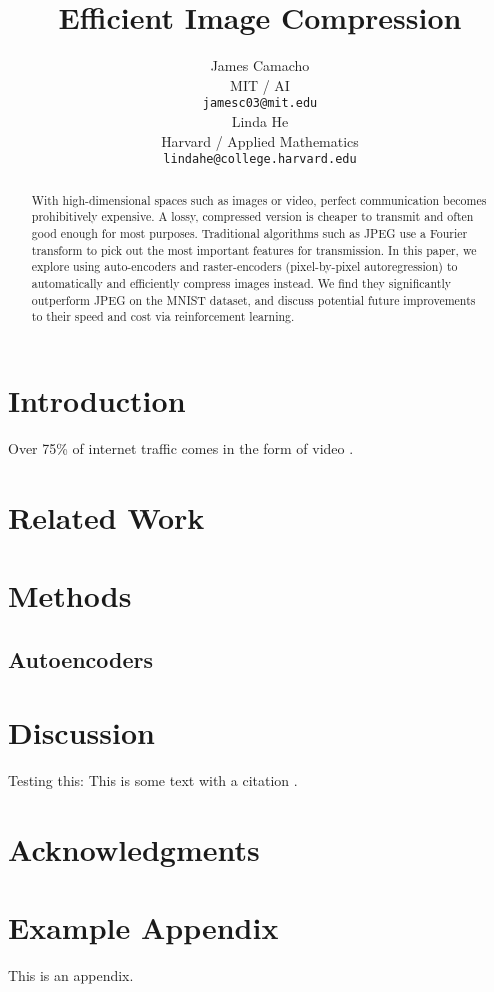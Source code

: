 \documentclass[11pt]{article}
\title{Efficient Image Compression}
\author{James Camacho \\
  MIT / AI \\
  \texttt{jamesc03@mit.edu} \\\And
  Linda He \\
  Harvard / Applied Mathematics \\
  \texttt{lindahe@college.harvard.edu} \\}
\begin{document}
\maketitle
\begin{abstract}
  With high-dimensional spaces such as images or video, perfect communication becomes prohibitively expensive. A lossy, compressed version is cheaper to transmit and often good enough for most purposes. Traditional algorithms such as JPEG use a Fourier transform to pick out the most important features for transmission. In this paper, we explore using auto-encoders and raster-encoders (pixel-by-pixel autoregression) to automatically and efficiently compress images instead. We find they significantly outperform JPEG on the MNIST dataset, and discuss potential future improvements to their speed and cost via reinforcement learning.
\end{abstract}


%   


\section{Introduction}

Over 75\% of internet traffic comes in the form of video \citep{cisco-2018-traffic}.

\section{Related Work}

\section{Methods}

\subsection{Autoencoders}


\section{Discussion}

Testing this: This is some text with a citation \citep{lazaridou-etal-2020-multi}.

\section*{Acknowledgments}



\appendix

\section{Example Appendix}
\label{sec:appendix}

This is an appendix.
\end{document}
